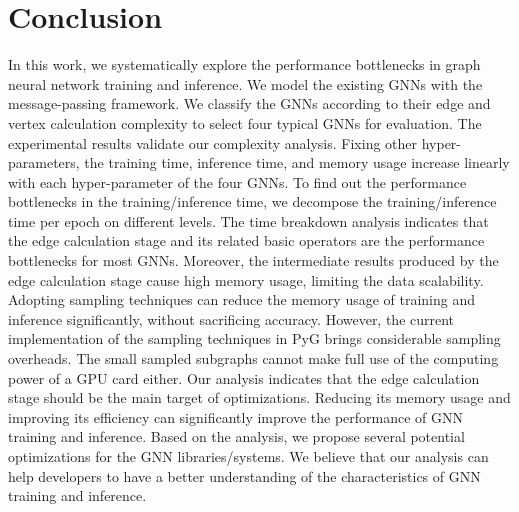 \section{Conclusion}
\label{sec:conclusion}

In this work, we systematically explore the performance bottlenecks in graph neural network training and inference.
%
We model the existing GNNs with the message-passing framework. 
%
We classify the GNNs according to their edge and vertex calculation complexity to select four typical GNNs for evaluation. 
%
The experimental results validate our complexity analysis.
%
Fixing other hyper-parameters, the training time, inference time, and memory usage increase linearly with each hyper-parameter of the four GNNs.
%
To find out the performance bottlenecks in the training/inference time, we decompose the training/inference time per epoch on different levels.
%
The time breakdown analysis indicates that the edge calculation stage and its related basic operators are the performance bottlenecks for most GNNs.
%
Moreover, the intermediate results produced by the edge calculation stage cause high memory usage, limiting the data scalability.
%
Adopting sampling techniques can reduce the memory usage of training and inference significantly, without sacrificing accuracy. 
%
However, the current implementation of the sampling techniques in PyG brings considerable sampling overheads.
%
The small sampled subgraphs cannot make full use of the computing power of a GPU card either.
% 
Our analysis indicates that the edge calculation stage should be the main target of optimizations.
%
Reducing its memory usage and improving its efficiency can significantly improve the performance of GNN training and inference.
%
Based on the analysis, we propose several potential optimizations for the GNN libraries/systems.
%
We believe that our analysis can help developers to have a better understanding of the characteristics of GNN training and inference.

